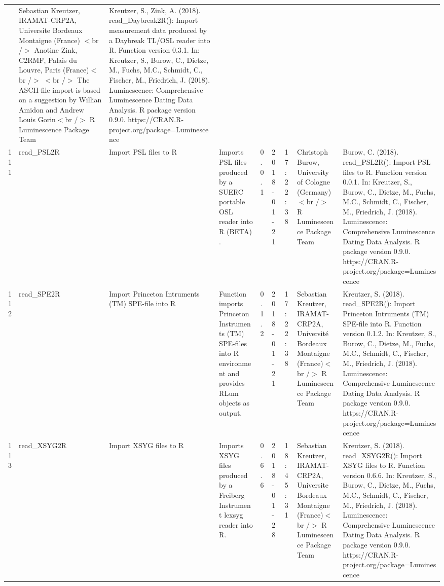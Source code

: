 \begin{table}[ht]
\begin{tabular}{rllllllll}
 & Sebastian Kreutzer, IRAMAT-CRP2A, Universite Bordeaux Montaigne (France) $<$br /$>$ Anotine Zink, C2RMF, Palais du Louvre, Paris (France)$<$br /$>$ $<$br /$>$ The ASCII-file import is based on a suggestion by Willian Amidon and Andrew Louis Gorin$<$br /$>$  R Luminescence Package Team & Kreutzer, S., Zink, A. (2018). read\_Daybreak2R(): Import measurement data produced by a Daybreak TL/OSL reader into R. Function version 0.3.1. In: Kreutzer, S., Burow, C., Dietze, M., Fuchs, M.C., Schmidt, C., Fischer, M., Friedrich, J. (2018). Luminescence: Comprehensive Luminescence Dating Data Analysis. R package version 0.9.0. https://CRAN.R-project.org/package=Luminescence
 \\ 
  111 & read\_PSL2R & Import PSL files to R & Imports PSL files produced by a SUERC portable OSL reader into R  (BETA) . & 0.0.1 & 2018-01-21 & 17:22:38
 & Christoph Burow, University of Cologne (Germany)$<$br /$>$  R Luminescence Package Team & Burow, C. (2018). read\_PSL2R(): Import PSL files to R. Function version 0.0.1. In: Kreutzer, S., Burow, C., Dietze, M., Fuchs, M.C., Schmidt, C., Fischer, M., Friedrich, J. (2018). Luminescence: Comprehensive Luminescence Dating Data Analysis. R package version 0.9.0. https://CRAN.R-project.org/package=Luminescence
 \\ 
  112 & read\_SPE2R & Import Princeton Intruments (TM) SPE-file into R & Function imports Princeton Instruments (TM) SPE-files into R environment and provides  RLum  objects as output. & 0.1.2 & 2018-01-21 & 17:22:38
 & Sebastian Kreutzer, IRAMAT-CRP2A, Université Bordeaux Montaigne (France)$<$br /$>$  R Luminescence Package Team & Kreutzer, S. (2018). read\_SPE2R(): Import Princeton Intruments (TM) SPE-file into R. Function version 0.1.2. In: Kreutzer, S., Burow, C., Dietze, M., Fuchs, M.C., Schmidt, C., Fischer, M., Friedrich, J. (2018). Luminescence: Comprehensive Luminescence Dating Data Analysis. R package version 0.9.0. https://CRAN.R-project.org/package=Luminescence
 \\ 
  113 & read\_XSYG2R & Import XSYG files to R & Imports XSYG files produced by a Freiberg Instrument lexsyg reader into R. & 0.6.6 & 2018-01-28 & 18:45:31
 & Sebastian Kreutzer, IRAMAT-CRP2A, Universite Bordeaux Montaigne (France)$<$br /$>$  R Luminescence Package Team & Kreutzer, S. (2018). read\_XSYG2R(): Import XSYG files to R. Function version 0.6.6. In: Kreutzer, S., Burow, C., Dietze, M., Fuchs, M.C., Schmidt, C., Fischer, M., Friedrich, J. (2018). Luminescence: Comprehensive Luminescence Dating Data Analysis. R package version 0.9.0. https://CRAN.R-project.org/package=Luminescence

\end{tabular}
\end{table}

